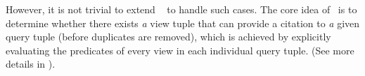 \begin{example}
{However, it is not trivial to extend \rba\ %
to handle such cases. %
The core idea of \rba\ is to determine whether there exists \textit{a} view tuple that can provide a citation to \textit{a} given query tuple (before duplicates are removed), which is achieved by explicitly evaluating the predicates of every view in each individual query tuple.  (See more details in \cite{wu2018data}).}
\end{example}
\vspace*{-0.3cm}
